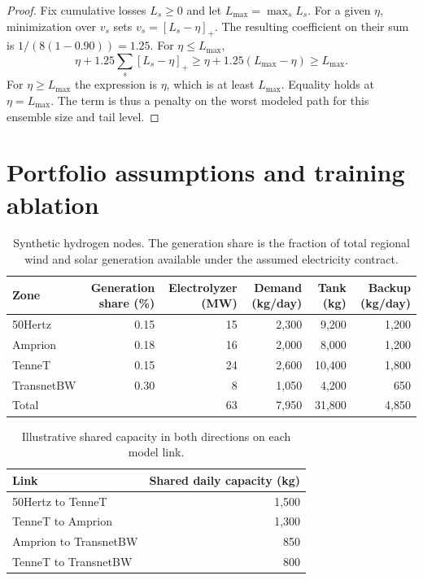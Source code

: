 \begin{proof}
Fix cumulative losses $L_s\ge0$ and let $L_{\max}=\max_s L_s$. For a given $\eta$, minimization over $v_s$ sets $v_s=[L_s-\eta]_+$. The resulting coefficient on their sum is $1/(8(1-0.90))=1.25$. For $\eta\le L_{\max}$,
\[
\eta+1.25\sum_s[L_s-\eta]_+\ge
\eta+1.25(L_{\max}-\eta)\ge L_{\max}.
\]
For $\eta\ge L_{\max}$ the expression is $\eta$, which is at least $L_{\max}$. Equality holds at $\eta=L_{\max}$. The term is thus a penalty on the worst modeled path for this ensemble size and tail level.
\end{proof}

\clearpage
\section{Portfolio assumptions and training ablation}
\label{app:tables}

\begin{table}[H]
\centering
\caption{Synthetic hydrogen nodes. The generation share is the fraction of total regional wind and solar generation available under the assumed electricity contract.}
\label{tab:sites}
\begin{tabular}{@{}lrrrrr@{}}
\toprule
Zone & Generation share (\%) & Electrolyzer (MW) & Demand (kg/day) & Tank (kg) & Backup (kg/day) \\
\midrule
50Hertz    & 0.15 & 15 & 2{,}300 & 9{,}200 & 1{,}200 \\
Amprion    & 0.18 & 16 & 2{,}000 & 8{,}000 & 1{,}200 \\
TenneT     & 0.15 & 24 & 2{,}600 & 10{,}400 & 1{,}800 \\
TransnetBW & 0.30 & 8  & 1{,}050 & 4{,}200 & 650 \\
\midrule
Total & & 63 & 7{,}950 & 31{,}800 & 4{,}850 \\
\bottomrule
\end{tabular}
\end{table}

\begin{table}[H]
\centering
\caption{Illustrative shared capacity in both directions on each model link.}
\label{tab:links}
\begin{tabular}{@{}lr@{}}
\toprule
Link & Shared daily capacity (kg) \\
\midrule
50Hertz to TenneT & 1{,}500 \\
TenneT to Amprion & 1{,}300 \\
Amprion to TransnetBW & 850 \\
TenneT to TransnetBW & 800 \\
\bottomrule
\end{tabular}
\end{table}

